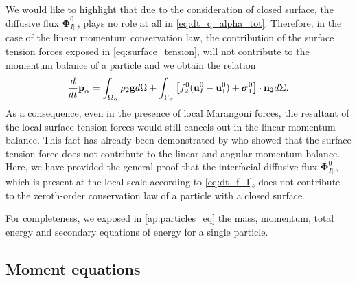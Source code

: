 We would like to highlight that  due to the consideration of closed surface, the diffusive flux $\mathbf{\Phi}_{I||}^0$, plays no role at all in \ref{eq:dt_q_alpha_tot}.
Therefore, in the case of the linear momentum conservation law, the contribution of the surface tension forces exposed in \ref{eq:surface_tension}, will not contribute to the momentum balance of a particle and we obtain the relation 
\begin{equation}
    \frac{d}{d t}  \textbf{p}_\alpha
    = \int_{\Omega_\alpha}  \rho_2\textbf{g}  d\Omega
    + \int_{\Gamma_\alpha}  \left[
        f_2^0 (\textbf{u}_I^0-\textbf{u}_1^0)
        + \bm{\sigma}_1^0
        \right] \cdot \textbf{n}_2  d\Sigma. 
    \label{eq:dt_q_alpha}
\end{equation}
As a consequence, even in the presence of local Marangoni forces, the resultant of the local surface tension forces would still cancels out in the linear momentum balance.
This fact has already been demonstrated by \citet{hesla1993note} who showed that the surface tension force does not contribute to the linear and angular momentum balance. 
Here, we have provided the general proof that the interfacial diffusive flux $\mathbf{\Phi}_{I||}^0$, which is present at the local scale according to \ref{eq:dt_f_I}, does not contribute to the zeroth-order conservation law of a particle with a closed surface.

For completeness, we exposed in \ref{ap:particles_eq} the mass, momentum, total energy and secondary equations of energy for a single particle.

\subsection{Moment equations}

